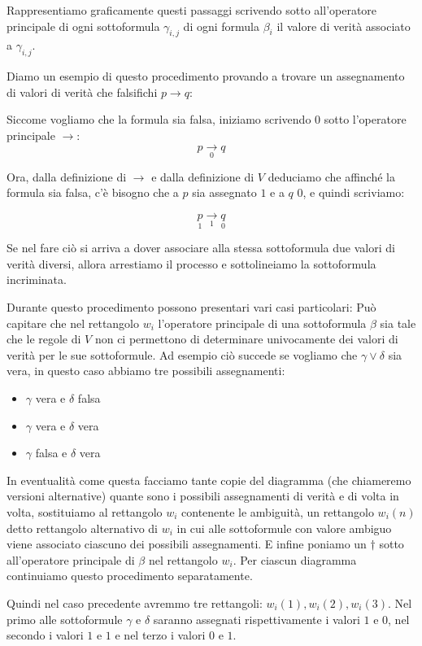 \documentclass[a4paper, titlepage, 12pt]{report}
\begin{document}
Rappresentiamo graficamente questi passaggi scrivendo sotto all'operatore principale
di ogni sottoformula $\gamma_{i,j}$ di ogni formula $\beta_i$
il valore di verità associato a $\gamma_{i,j}$.

Diamo un esempio di questo procedimento provando a trovare un assegnamento
di valori di verità che falsifichi $p \rightarrow q$:

Siccome vogliamo che la formula sia falsa, iniziamo scrivendo $0$ sotto l'operatore principale $\rightarrow$:
$$p \underset{0}{\rightarrow} q$$

Ora, dalla definizione di $\rightarrow$ e dalla definizione di $V$
deduciamo che affinché la formula sia falsa, c'è bisogno
che a $p$ sia assegnato $1$ e a $q$ $0$, e quindi scriviamo:

$$\underset{1}{p} \underset{1}{\rightarrow} \underset{0}{q}$$

Se nel fare ciò si arriva a dover associare alla stessa sottoformula
due valori di verità diversi, allora arrestiamo il processo e sottolineiamo
la sottoformula incriminata.

Durante questo procedimento possono presentari vari casi particolari:
Può capitare che nel rettangolo $w_i$ l'operatore principale di una sottoformula $\beta$ sia tale che le regole di $V$
non ci permettono di determinare univocamente dei valori di verità per le sue sottoformule.
Ad esempio ciò succede se vogliamo che $\gamma \lor \delta$ sia vera, in questo caso abbiamo tre possibili
assegnamenti:
\begin{itemize}
    \item $\gamma$ vera  e $\delta$ falsa
    \item $\gamma$ vera  e $\delta$ vera
    \item $\gamma$ falsa e $\delta$ vera
\end{itemize}

In eventualità come questa facciamo tante copie del diagramma (che chiameremo versioni alternative)
quante sono i possibili assegnamenti di verità e di volta in volta, sostituiamo al rettangolo $w_i$ contenente le ambiguità,
un rettangolo $w_i(n)$ detto rettangolo alternativo di $w_i$ in cui alle sottoformule
con valore ambiguo viene associato ciascuno dei possibili assegnamenti.
E infine poniamo un $\dagger$ sotto all'operatore principale di $\beta$ nel rettangolo $w_i$.
Per ciascun diagramma continuiamo questo procedimento separatamente.

Quindi nel caso precedente avremmo tre rettangoli: $w_i(1), w_i(2), w_i(3)$.
Nel primo alle sottoformule $\gamma$ e $\delta$ saranno assegnati rispettivamente i valori $1$ e $0$,
nel secondo i valori $1$ e $1$ e nel terzo i valori $0$ e $1$.
\end{document}
